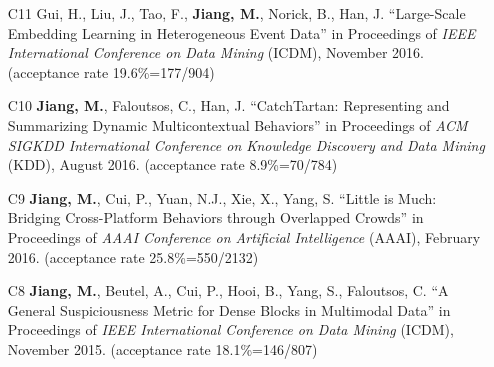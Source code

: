 \documentclass[10pt]{article}
\newenvironment{myindentpar}[1]%
{\begin{list}{}%
         {\setlength{\leftmargin}{#1}}%
         \item[]%
}
{\end{list}}
\newcounter{list}
\begin{document}
\begin{myindentpar}{0.00cm}
\begin{enumerate}[leftmargin=.5cm]
\vspace{-0.1cm}

\item[C11] Gui, H., Liu, J., Tao, F., \textbf{Jiang, M.}, Norick, B., Han, J. ``Large-Scale Embedding Learning in Heterogeneous Event Data'' in Proceedings of \emph{IEEE International Conference on Data Mining} (ICDM), November 2016. (acceptance rate 19.6\%=177/904)

\vspace{-0.1cm}

\item[C10] \textbf{Jiang, M.}, Faloutsos, C., Han, J. ``CatchTartan: Representing and Summarizing Dynamic Multicontextual Behaviors'' in Proceedings of \emph{ACM SIGKDD International Conference on Knowledge Discovery and Data Mining} (KDD), August 2016. (acceptance rate 8.9\%=70/784)

\vspace{-0.1cm}

\item[C9] \textbf{Jiang, M.}, Cui, P., Yuan, N.J., Xie, X., Yang, S. ``Little is Much: Bridging Cross-Platform Behaviors through Overlapped Crowds'' in Proceedings of \emph{AAAI Conference on Artificial Intelligence} (AAAI), February 2016. (acceptance rate 25.8\%=550/2132)

\vspace{-0.1cm}

\item[C8] \textbf{Jiang, M.}, Beutel, A., Cui, P., Hooi, B., Yang, S., Faloutsos, C. ``A General Suspiciousness Metric for Dense Blocks in Multimodal Data'' in Proceedings of \emph{IEEE International Conference on Data Mining} (ICDM), November 2015. (acceptance rate 18.1\%=146/807)


\end{enumerate}
\end{myindentpar}
\end{document}
